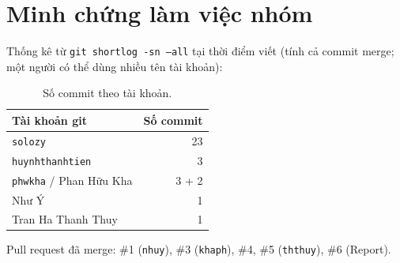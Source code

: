 \chapter{Minh chứng làm việc nhóm}
\label{app:minh-chung-nhom}


Thống kê từ \texttt{git shortlog -sn --all} tại thời điểm viết (tính cả commit merge; một người có thể
dùng nhiều tên tài khoản):

\begin{table}[H]
  \centering
  \small
  \begin{tabular}{l r}
    \toprule
    \textbf{Tài khoản git} & \textbf{Số commit} \\
    \midrule
    \texttt{solozy} & 23 \\
    \texttt{huynhthanhtien} & 3 \\
    \texttt{phwkha} / Phan Hữu Kha & 3 + 2 \\
    Như Ý & 1 \\
    Tran Ha Thanh Thuy & 1 \\
    \bottomrule
  \end{tabular}
  \caption{Số commit theo tài khoản.}
\end{table}

Pull request đã merge: \#1 (\texttt{nhuy}), \#3 (\texttt{khaph}), \#4, \#5 (\texttt{ththuy}), \#6 (Report).
